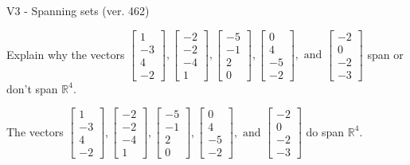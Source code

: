 \begin{exercise}
  \begin{exerciseTitle}V3 - Spanning sets (ver. 462)\end{exerciseTitle}
  \begin{exerciseStatement}
    Explain why the vectors \(\left[\begin{array}{r}
1 \\
-3 \\
4 \\
-2
\end{array}\right] , \left[\begin{array}{r}
-2 \\
-2 \\
-4 \\
1
\end{array}\right] , \left[\begin{array}{r}
-5 \\
-1 \\
2 \\
0
\end{array}\right] , \left[\begin{array}{r}
0 \\
4 \\
-5 \\
-2
\end{array}\right] , \text{ and } \left[\begin{array}{r}
-2 \\
0 \\
-2 \\
-3
\end{array}\right]\) span or don't span \(\mathbb{R}^4\). 
	


  \end{exerciseStatement}
  \begin{exerciseAnswer}
   The vectors \(\left[\begin{array}{r}
1 \\
-3 \\
4 \\
-2
\end{array}\right] , \left[\begin{array}{r}
-2 \\
-2 \\
-4 \\
1
\end{array}\right] , \left[\begin{array}{r}
-5 \\
-1 \\
2 \\
0
\end{array}\right] , \left[\begin{array}{r}
0 \\
4 \\
-5 \\
-2
\end{array}\right] , \text{ and } \left[\begin{array}{r}
-2 \\
0 \\
-2 \\
-3
\end{array}\right]\) 
  	 do  
	span \(\mathbb{R}^4\).
  



\end{exerciseAnswer}
\end{exercise}
